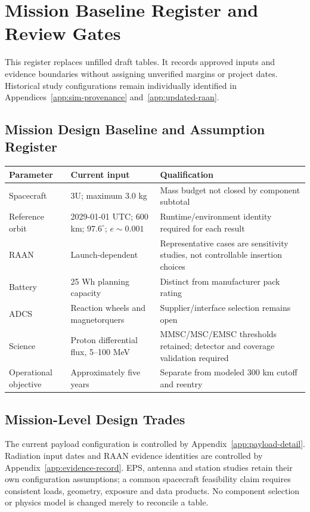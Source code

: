 \section{Mission Baseline Register and Review Gates}\label{app:source-02}
This register replaces unfilled draft tables. It records approved inputs and evidence boundaries without assigning unverified margins or project dates. Historical study configurations remain individually identified in Appendices~\ref{app:sim-provenance} and~\ref{app:updated-raan}.

\subsection{Mission Design Baseline and Assumption Register}
\begin{table}[H]\centering\small
\begin{tabularx}{\linewidth}{@{}p{3.2cm}p{4cm}X@{}}\toprule
Parameter & Current input & Qualification\\\midrule
Spacecraft & 3U; maximum 3.0 kg & Mass budget not closed by component subtotal\\
Reference orbit & 2029-01-01 UTC; 600 km; $97.6^\circ$; $e\sim0.001$ & Runtime/environment identity required for each result\\
RAAN & Launch-dependent & Representative cases are sensitivity studies, not controllable insertion choices\\
Battery & 25 Wh planning capacity & Distinct from manufacturer pack rating\\
ADCS & Reaction wheels and magnetorquers & Supplier/interface selection remains open\\
Science & Proton differential flux, 5--100 MeV & MMSC/MSC/EMSC thresholds retained; detector and coverage validation required\\
Operational objective & Approximately five years & Separate from modeled 300 km cutoff and reentry\\\bottomrule
\end{tabularx}\end{table}

\subsection{Mission-Level Design Trades}
The current payload configuration is controlled by Appendix~\ref{app:payload-detail}. Radiation input dates and RAAN evidence identities are controlled by Appendix~\ref{app:evidence-record}. EPS, antenna and station studies retain their own configuration assumptions; a common spacecraft feasibility claim requires consistent loads, geometry, exposure and data products. No component selection or physics model is changed merely to reconcile a table.

